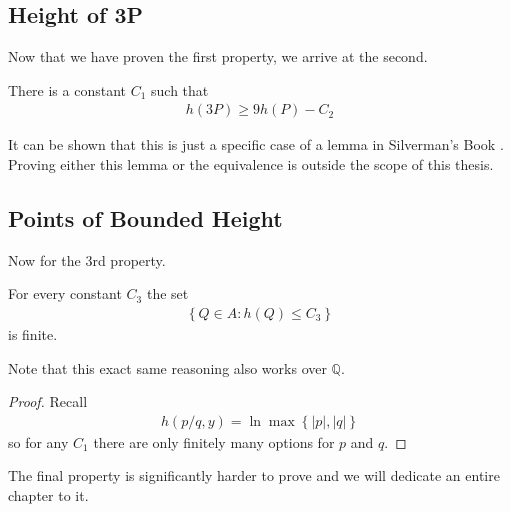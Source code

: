 \subsection{Height of 3P}%
\label{sub:height_of_3p}
Now that we have proven the first property, we arrive at the second.
\begin{lemma} \label{lem:height3p}
  There is a constant $C_1$ such that
  \begin{align*}
    h(3P) \geq 9h(P) - C_2
  \end{align*}
\end{lemma}
It can be shown \cite[Appendix B]{moniqueThesis} that
this is just a specific case of
a lemma in Silverman's Book \cite[Lemma 3.6]{silvermanRationalPoints}.
Proving either this lemma or the equivalence is outside the scope of this thesis.

\subsection{Points of Bounded Height}%
\label{sub:points_of_bounded_height}
Now for the 3rd property.
\begin{lemma} \label{lem:pointsOfBoundedHeight}
  For every constant $C_3$ the set
  \begin{align*}
    \left\{ Q \in A : h(Q) \leq C_3 \right\}
  \end{align*}
  is finite.
\end{lemma}
Note that this exact same reasoning also works over $\mathbb{Q}$.
\begin{proof}
  Recall
  \begin{align*}
    h(p/q, y) = \ln \max \left\{ |p|, |q| \right\}
  \end{align*}
  so for any $C_1$ there are only
  finitely many options for $p$ and $q$.
\end{proof}
The final property is significantly harder to prove and we will dedicate
an entire chapter to it.

